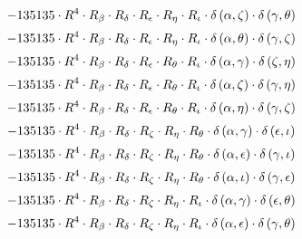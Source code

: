 \begin{subequations}
\begin{gather}
 \\[0.2em] \notag 		 - 135135 \cdot R^{4} \cdot R_{\beta{}} \cdot R_{\delta{}} \cdot R_{\epsilon{}} \cdot R_{\eta{}} \cdot R_{\iota{}} \cdot \delta{}\left(\alpha{}, \zeta{}\right) \cdot \delta{}\left(\gamma{}, \theta{}\right) 
 \\[0.2em] \notag 		 - 135135 \cdot R^{4} \cdot R_{\beta{}} \cdot R_{\delta{}} \cdot R_{\epsilon{}} \cdot R_{\eta{}} \cdot R_{\iota{}} \cdot \delta{}\left(\alpha{}, \theta{}\right) \cdot \delta{}\left(\gamma{}, \zeta{}\right) 
 \\[0.2em] \notag 		 - 135135 \cdot R^{4} \cdot R_{\beta{}} \cdot R_{\delta{}} \cdot R_{\epsilon{}} \cdot R_{\theta{}} \cdot R_{\iota{}} \cdot \delta{}\left(\alpha{}, \gamma{}\right) \cdot \delta{}\left(\zeta{}, \eta{}\right) 
 \\[0.2em] \notag 		 - 135135 \cdot R^{4} \cdot R_{\beta{}} \cdot R_{\delta{}} \cdot R_{\epsilon{}} \cdot R_{\theta{}} \cdot R_{\iota{}} \cdot \delta{}\left(\alpha{}, \zeta{}\right) \cdot \delta{}\left(\gamma{}, \eta{}\right) 
 \\[0.2em] \notag 		 - 135135 \cdot R^{4} \cdot R_{\beta{}} \cdot R_{\delta{}} \cdot R_{\epsilon{}} \cdot R_{\theta{}} \cdot R_{\iota{}} \cdot \delta{}\left(\alpha{}, \eta{}\right) \cdot \delta{}\left(\gamma{}, \zeta{}\right) 
 \\[0.2em] \notag 		 - 135135 \cdot R^{4} \cdot R_{\beta{}} \cdot R_{\delta{}} \cdot R_{\zeta{}} \cdot R_{\eta{}} \cdot R_{\theta{}} \cdot \delta{}\left(\alpha{}, \gamma{}\right) \cdot \delta{}\left(\epsilon{}, \iota{}\right) 
 \\[0.2em] \notag 		 - 135135 \cdot R^{4} \cdot R_{\beta{}} \cdot R_{\delta{}} \cdot R_{\zeta{}} \cdot R_{\eta{}} \cdot R_{\theta{}} \cdot \delta{}\left(\alpha{}, \epsilon{}\right) \cdot \delta{}\left(\gamma{}, \iota{}\right) 
 \\[0.2em] \notag 		 - 135135 \cdot R^{4} \cdot R_{\beta{}} \cdot R_{\delta{}} \cdot R_{\zeta{}} \cdot R_{\eta{}} \cdot R_{\theta{}} \cdot \delta{}\left(\alpha{}, \iota{}\right) \cdot \delta{}\left(\gamma{}, \epsilon{}\right) 
 \\[0.2em] \notag 		 - 135135 \cdot R^{4} \cdot R_{\beta{}} \cdot R_{\delta{}} \cdot R_{\zeta{}} \cdot R_{\eta{}} \cdot R_{\iota{}} \cdot \delta{}\left(\alpha{}, \gamma{}\right) \cdot \delta{}\left(\epsilon{}, \theta{}\right) 
 \\[0.2em] \notag 		 - 135135 \cdot R^{4} \cdot R_{\beta{}} \cdot R_{\delta{}} \cdot R_{\zeta{}} \cdot R_{\eta{}} \cdot R_{\iota{}} \cdot \delta{}\left(\alpha{}, \epsilon{}\right) \cdot \delta{}\left(\gamma{}, \theta{}\right) 

\end{gather}
\end{subequations}
